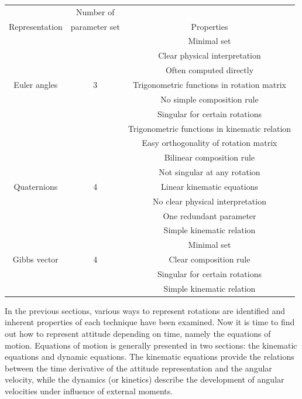 \label{tab:attRepSelection}
\begin{center}
 \begin{tabular}{||c || c | c ||}
 \hline
 &Number of  &  \\ [0.5ex] 
Representation &parameter set & Properties \\ [0.5ex] 
 \hline\hline
& & Minimal set\\ 
& & Clear physical interpretation\\ 
& & Often computed directly\\ 
 Euler angles   & 3 & Trigonometric functions in rotation matrix \\ 
& & No simple composition rule \\ 
& & Singular for certain rotations \\ 
& & Trigonometric functions in kinematic relation \\ 
 \hline
& & Easy orthogonality of rotation matrix\\ 
& & Bilinear composition rule\\ 
& & Not singular at any rotation\\ 
Quaternions   & 4 & Linear kinematic equations \\ 
& & No clear physical interpretation \\ 
& &One redundant parameter \\ 
& & Simple kinematic relation \\ 
 \hline
& & Minimal set\\ 
Gibbs vector   & 4 & Clear composition rule\\ 
& & Singular for certain rotations \\ 
& & Simple kinematic relation \\[1ex] 
 \hline
\end{tabular}
\end{center}


In the previous sections, various ways to represent rotations are identified 
and inherent properties of each technique have been examined. Now it is 
time to find out how to represent attitude depending on time, namely the 
equations of motion. Equations of motion is generally presented in two 
sections: the kinematic equations and dynamic equations. 
The kinematic equations provide the relations between the time derivative 
of the attitude representation and the angular velocity, while the dynamics 
(or kinetics) describe the development of angular velocities under influence 
of external moments.

